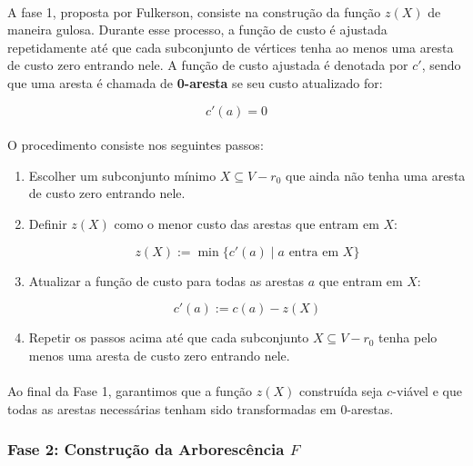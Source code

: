 \documentclass[12pt,a4paper]{article}
\begin{document}
\paragraph{}
A fase 1, proposta por Fulkerson, consiste na construção da função \( z(X) \) de maneira gulosa. Durante esse processo, a função de custo é ajustada repetidamente até que cada subconjunto de vértices tenha ao menos uma aresta de custo zero entrando nele. A função de custo ajustada é denotada por \( c' \), sendo que uma aresta é chamada de \textbf{0-aresta} se seu custo atualizado for:

\[c'(a) = 0\]

\paragraph{}
O procedimento consiste nos seguintes passos:

\begin{enumerate}
    \item Escolher um subconjunto mínimo \( X \subseteq V - r_0 \) que ainda não tenha uma aresta de custo zero entrando nele.
    \item Definir \( z(X) \) como o menor custo das arestas que entram em \( X \):

    \[
    z(X) := \min \{ c'(a) \mid a \text{ entra em } X \}
    \]

    \item Atualizar a função de custo para todas as arestas \( a \) que entram em \( X \):

    \[
    c'(a) := c(a) - z(X)
    \]

    \item Repetir os passos acima até que cada subconjunto \( X \subseteq V - r_0 \) tenha pelo menos uma aresta de custo zero entrando nele.
\end{enumerate}

\paragraph{}
Ao final da Fase 1, garantimos que a função \( z(X) \) construída seja \( c \)-viável e que todas as arestas necessárias tenham sido transformadas em 0-arestas.

\subsubsection{Fase 2: Construção da Arborescência \texorpdfstring{$F$}{F}}
\end{document}
